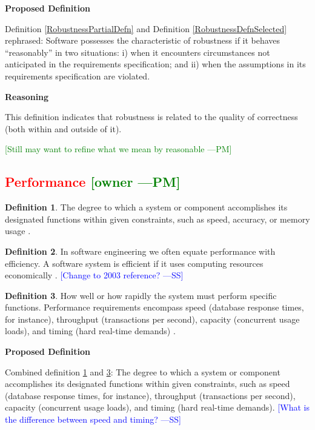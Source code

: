 \documentclass[letterpaper, cleveref]{lipics-v2019}
\newcommand{\authornote}[3]{\textcolor{#1}{[#3 ---#2]}}
\newcommand{\authornote}[3]{}
\newcommand{\wss}[1]{\authornote{blue}{SS}{#1}} %
\newcommand{\pmi}[1]{\authornote{green}{PM}{#1}} %
\newcommand{\notdone}[1]{\textcolor{red}{#1}}
\theoremstyle{definition}
\newtheorem{defn}{Definition}
\begin{document}
\noindent \textbf{Proposed Definition}

Definition \ref{RobustnessPartialDefn} and Definition
\ref{RobustnessDefnSelected} rephrased: Software possesses the characteristic of
robustness if it behaves ``reasonably'' in two situations: i) when it encounters
circumstances not anticipated in the requirements specification; and ii) when
the assumptions in its requirements specification are violated.

\noindent \textbf{Reasoning}

This definition indicates that robustness is related to the quality of
correctness (both within and outside of it). 

\pmi{Still may want to refine what we mean by reasonable}


\subsection{\notdone{Performance} \pmi{owner}}

\begin{defn} \label{PerformanceDefnSelected}
  The degree to which a system or component accomplishes its designated
  functions within given constraints, such as speed, accuracy, or memory
  usage \citep{IEEEStdGlossarySET1990}.
\end{defn}

\begin{defn}
	In software engineering we often equate performance with efficiency. A
  software system is efficient if it uses computing resources economically
  \citep{ghezzi1991fundamentals}.  \wss{Change to 2003 reference?}
\end{defn}

\begin{defn} \label{PerformanceDefnSelected2}
	How well or how rapidly the system must perform specific functions. Performance
	requirements encompass speed (database response times, for instance), throughput
	(transactions per second), capacity (concurrent usage loads), and timing (hard
	real-time demands) \citep{wiegers2003softreq}.
\end{defn}

\noindent \textbf{Proposed Definition}

Combined definition \ref{PerformanceDefnSelected} and
\ref{PerformanceDefnSelected2}: The degree to which a system or component
accomplishes its designated functions within given constraints, such as speed
(database response times, for instance), throughput (transactions per second),
capacity (concurrent usage loads), and timing (hard real-time
demands). \wss{What is the difference between speed and timing?}
\end{document}
